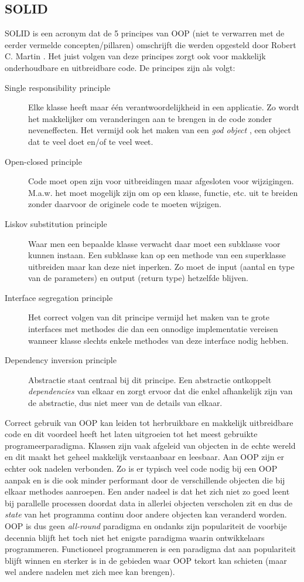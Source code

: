 \subsection{SOLID}
SOLID is een acronym dat de 5 principes van OOP (niet te verwarren met de eerder vermelde concepten/pillaren) omschrijft die werden opgesteld door Robert C. Martin \autocite{Buysse2017-2018}.  Het juist volgen van deze principes zorgt ook voor makkelijk onderhoudbare en uitbreidbare code. De principes zijn als volgt:
\begin{description}
  \item [Single responsibility principle] Elke klasse heeft maar één verantwoordelijkheid in een applicatie. Zo wordt het makkelijker om veranderingen aan te brengen in de code zonder neveneffecten. Het vermijd ook het maken van een \textit{god object} \autocite{Riel1996}, een object dat te veel doet en/of te veel weet.
  \item [Open-closed principle] Code moet open zijn voor uitbreidingen maar afgesloten voor wijzigingen. M.a.w. het moet mogelijk zijn om op een klasse, functie, etc. uit te breiden zonder daarvoor de originele code te moeten wijzigen. 
  \item [Liskov substitution principle] Waar men een bepaalde klasse verwacht daar moet een subklasse voor kunnen instaan. Een subklasse kan op een methode van een superklasse uitbreiden maar kan deze niet inperken. Zo moet de input (aantal en type van de parameters) en output (return type) hetzelfde blijven.
  \item [Interface segregation principle] Het correct volgen van dit principe vermijd het maken van te grote interfaces met methodes die dan een onnodige implementatie vereisen wanneer klasse slechts enkele methodes van deze interface nodig hebben.
  \item [Dependency inversion principle] Abstractie staat centraal bij dit principe. Een abstractie ontkoppelt \textit{dependencies} van elkaar en zorgt ervoor dat die enkel afhankelijk zijn van de abstractie, dus niet meer van de details van elkaar.
\end{description}

Correct gebruik van OOP kan leiden tot herbruikbare en makkelijk uitbreidbare code en dit voordeel heeft het laten uitgroeien tot het meest gebruikte programeerparadigma. Klassen zijn vaak afgeleid van objecten in de echte wereld en dit maakt het geheel makkelijk verstaanbaar en leesbaar. Aan OOP zijn er echter ook nadelen verbonden. Zo is er typisch veel code nodig bij een OOP aanpak en is die ook minder performant door de verschillende objecten die bij elkaar methodes aanroepen. Een ander nadeel is dat het zich niet zo goed leent bij parallelle processen doordat data in allerlei objecten verscholen zit en dus de \textit{state} van het programma continu door andere objecten kan veranderd worden. OOP is dus geen \textit{all-round} paradigma en ondanks zijn populariteit de voorbije decennia blijft het toch niet het enigste paradigma waarin ontwikkelaars programmeren. Functioneel programmeren is een paradigma dat aan populariteit blijft winnen en sterker is in de gebieden waar OOP tekort kan schieten (maar wel andere nadelen met zich mee kan brengen).

